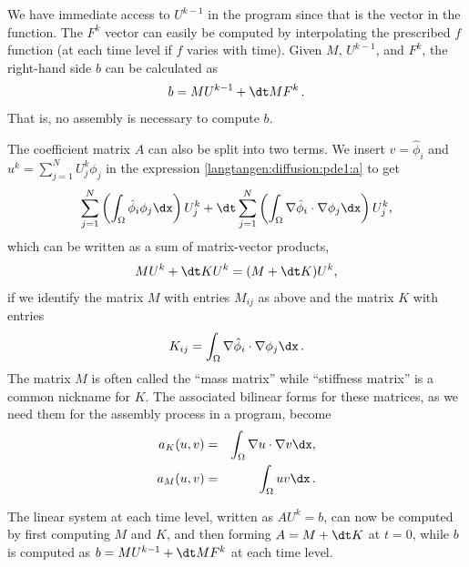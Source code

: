 We have immediate access to $U^{k-1}$
in the program since that is the vector
in the  function. The $F^k$ vector can easily be
computed by interpolating the prescribed $f$ function (at each time level if
$f$ varies with time). Given $M$, $U^{k-1}$, and $F^k$, the right-hand side
$b$ can be calculated as
\[ b = MU^{k-1} + {\dt} MF^k \langtangenep\]
That is, no assembly is necessary to compute $b$.

The coefficient matrix $A$ can also be split into two terms.
We insert $v=\hat\phi_i$ and $u^k = \sum_{j=1}^N U^k_j\phi_j$ in
the expression \eqref{langtangen:diffusion:pde1:a} to get
\[ \sum_{j=1}^N \left(\int_\Omega \hat\phi_i\phi_j\dx\right)U^k_j + {\dt}
\sum_{j=1}^N \left(\int_\Omega \nabla\hat\phi_i\cdot\nabla\phi_j\dx\right)U^k_j,
\]
which can be written as a sum of matrix-vector products,
\[ MU^k + {\dt} KU^k = (M + {\dt} K)U^k,\]
if we identify the matrix $M$ with entries $M_{ij}$ as above and
the matrix $K$ with entries
\begin{equation} K_{ij} = \int_\Omega \nabla\hat\phi_i\cdot\nabla\phi_j\dx\langtangenep
\end{equation}
The matrix $M$ is often called the ``mass matrix'' while ``stiffness matrix''
is a common nickname for $K$. The associated bilinear forms for these
matrices, as we need them for the assembly process in a \fenics{}
program, become
\begin{eqnarray}
a_K(u,v) &=& \int_\Omega\nabla u\cdot\nabla v\dx,
\label{langtangen:diffusion:pde1:aK}\\
a_M(u,v) &=& \int_\Omega uv\dx \label{langtangen:diffusion:pde1:aM}\langtangenep
\end{eqnarray}

The linear system at each time level, written as $AU^k=b$,
can now be computed by first computing $M$ and $K$, and then forming
$A=M+{\dt} K$ at $t=0$, while $b$ is computed as
$b=MU^{k-1} + {\dt}MF^k$ at each time level.

